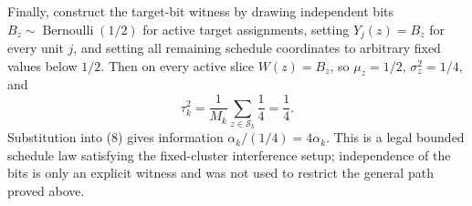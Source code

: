 Finally, construct the target-bit witness by drawing independent bits \(B_z\sim\operatorname{Bernoulli}(1/2)\) for active target assignments, setting \(Y_j(z)=B_z\) for every unit \(j\), and setting all remaining schedule coordinates to arbitrary fixed values below \(1/2\).  Then on every active slice \(W(z)=B_z\), so \(\mu_z=1/2\), \(\sigma_z^2=1/4\), and
\[
 \tau_k^2=\frac1{M_k}\sum_{z\in\mathcal S_k}\frac14=\frac14.
\]
Substitution into (8) gives information \(\alpha_k/(1/4)=4\alpha_k\).  This is a legal bounded schedule law satisfying the fixed-cluster interference setup; independence of the bits is only an explicit witness and was not used to restrict the general path proved above.